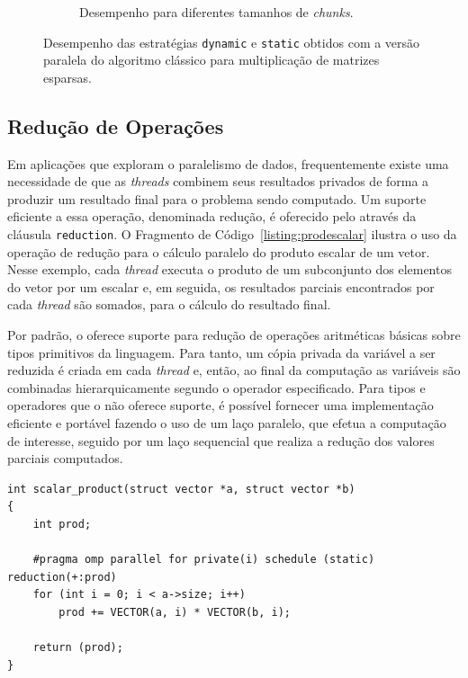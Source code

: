 \documentclass{SBCbookchapter}
\begin{document}
\begin{figure}[t]
\begin{subfigure}{0.47\linewidth}
					\caption{Desempenho para diferentes tamanhos de
					\textit{chunks}.}
					\label{fig:chunk-size}
				\end{subfigure}
			\caption{Desempenho das estratégias \texttt{dynamic} e \texttt{static} obtidos com a versão paralela
			do algoritmo clássico para multiplicação de matrizes esparsas.}
		\end{figure}

	\subsection{Redução de Operações}
	\label{subsection: reducao de operacoes}

		Em aplicações que exploram o paralelismo de dados,
		frequentemente existe uma necessidade de que as \textit{threads}
		combinem seus resultados privados de forma a produzir um
		resultado final para o problema sendo computado. Um suporte
		eficiente a essa operação, denominada redução, é oferecido pelo
		\openmp através da cláusula \texttt{reduction}. O Fragmento de
		Código~\ref{listing:prodescalar} ilustra o uso da operação de
		redução para o cálculo paralelo do produto escalar de um vetor.
		Nesse exemplo, cada \textit{thread} executa o produto de um
		subconjunto dos elementos do vetor por um escalar e, em seguida,
		os resultados parciais encontrados por cada \textit{thread} são
		somados, para o cálculo do resultado final.

		Por padrão, o \openmp oferece suporte  para redução de operações
		aritméticas básicas sobre tipos primitivos da linguagem. Para
		tanto, um cópia privada da variável a ser reduzida é criada em
		cada \textit{thread} e, então, ao final da computação as
		variáveis são combinadas hierarquicamente segundo o operador
		especificado. Para tipos e operadores que o \openmp não oferece
		suporte, é possível fornecer uma implementação eficiente e
		portável fazendo o uso de um laço paralelo, que efetua a
		computação de interesse, seguido por um laço sequencial que
		realiza a redução dos valores parciais computados.

\begin{lstlisting}[frame=single, caption=Produto escalar.,
label=listing:prodescalar]
int scalar_product(struct vector *a, struct vector *b)
{
	int prod;

	#pragma omp parallel for private(i) schedule (static) reduction(+:prod)
	for (int i = 0; i < a->size; i++)
		prod += VECTOR(a, i) * VECTOR(b, i);
	
	return (prod);
}
\end{lstlisting}
\end{document}
